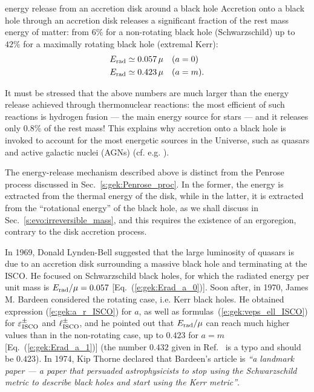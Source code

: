 \begin{tprop}{energy release from an accretion disk around a black hole}{}
Accretion onto a black hole through an accretion disk releases a significant
fraction of the rest mass energy of matter: from $6\%$ for a non-rotating
black hole (Schwarzschild) up to $42\%$ for a maximally rotating black hole
(extremal Kerr):
\begin{subequations}
\begin{align}
    & E_{\rm rad} \simeq 0.057 \, \mu \quad (a=0)  \label{e:gek:Erad_a_0}\\
    & E_{\rm rad} \simeq 0.423 \, \mu \quad (a=m) . \label{e:gek:Erad_a_1}
\end{align}
\end{subequations}
\end{tprop}

It must be stressed that the above numbers are much larger than the energy
release achieved through thermonuclear reactions: the most efficient
of such reactions is hydrogen fusion --- the main energy source for stars --- and
it releases only $0.8\%$ of the rest mass! This explains why accretion onto a
black hole is invoked to account for the most energetic sources in the Universe,
such as quasars and
active galactic nuclei (AGNs)
(cf. e.g. \cite{Colli09}).

\begin{remark}
The energy-release mechanism described above is distinct from the Penrose
process discussed in Sec.~\ref{s:gek:Penrose_proc}. In the former, the
energy is extracted from the thermal energy of the disk, while in the latter,
it is extracted from the ``rotational energy'' of the black hole,
as we shall discuss in Sec.~\ref{s:evo:irreversible_mass},
and this requires the existence of an ergoregion, contrary to the disk accretion
process.
\end{remark}

\begin{hist}
In 1969, Donald Lynden-Bell \cite{Lynde69} suggested
that the large luminosity
of quasars is due to an accretion disk surrounding a massive black hole and
terminating at the ISCO. He focused on Schwarzschild black holes,
for which the radiated energy per unit mass is $E_{\rm rad}/\mu = 0.057$
[Eq.~(\ref{e:gek:Erad_a_0})]. Soon after, in 1970,
James M. Bardeen \cite{Barde70a}
considered the rotating case, i.e. Kerr black holes.
He obtained expression (\ref{e:gek:a_r_ISCO}) for $a$, as well as formulas~(\ref{e:gek:veps_ell_ISCO}) for $\varepsilon_{\rm ISCO}^\pm$
and $\ell_{\rm ISCO}^\pm$, and he pointed out that $E_{\rm rad}/\mu$ can reach much higher values than
in the non-rotating case,
up to $0.423$ for $a=m$ [Eq.~(\ref{e:gek:Erad_a_1})] (the number $0.432$ given in Ref.~\cite{Barde70a} is a typo and should be $0.423$). In 1974, Kip Thorne \cite{Thorn74}
declared that Bardeen's article \cite{Barde70a} is \emph{``a landmark paper --- a paper that persuaded astrophysicists to stop using the
Schwarzschild metric to describe black holes and start using the Kerr metric''}.
\end{hist}

